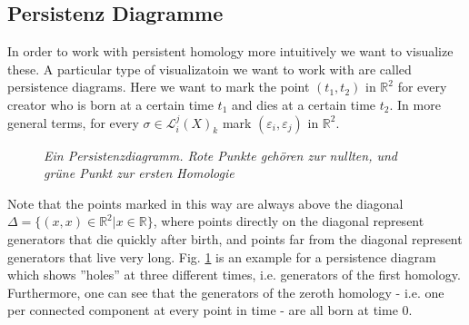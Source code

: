 \documentclass[11pt, a4paper,draft]{report}
\newcommand{\bR}{\mathbb{R}}
\begin{document}
	\subsection{Persistenz Diagramme}
	
	In order to work with persistent homology more intuitively we want to visualize these. A particular type of visualizatoin we want to work with are called persistence diagrams. Here we want to mark the point $(t_1,t_2)$ in $\bR^2$ for every creator who is born at a certain time $t_1$ and dies at a certain time $t_2$. In more general terms, for every $\sigma\in\mathcal{L}_i^j(X)_k$ mark $(\varepsilon_i,\varepsilon_j)$ in $\bR^2$.\\
	\begin{figure}
		\centering
	\caption{\textit{Ein Persistenzdiagramm. Rote Punkte gehören zur nullten, und grüne Punkt zur ersten Homologie}}
\label{fig2}
	\end{figure}

 Note that the points marked in this way are always above the diagonal $\Delta=\{(x,x)\in\bR^2|x\in\bR\}$, where points directly on the diagonal represent generators that die quickly after birth, and points far from the diagonal represent generators that live very long. Fig. \ref{fig2} is an example for a persistence diagram which shows ''holes'' at three different times, i.e. generators of the first homology. Furthermore, one can see that the generators of the zeroth homology - i.e. one per connected component at every point in time - are all born at time 0.\\
\end{document}
